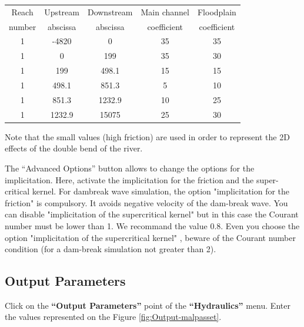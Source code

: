 \documentclass[a4paper,12pt]{article}
\begin{document}
\begin{table}[h]

\begin{center}

\begin{tabular}{|c|c|c|c|c|}


\hline 
Reach & Upstream & Downstream & Main channel & Floodplain \tabularnewline
number & abscissa & abscissa & coefficient & coefficient \tabularnewline
\hline 
\hline 
1 & -4820 & 0 & 35 & 35\tabularnewline
\hline 
1 & 0 & 199 & 35 & 30\tabularnewline
\hline 
1 & 199 & 498.1 & 15 & 15\tabularnewline
\hline 
1 & 498.1 & 851.3 & 5 & 10\tabularnewline
\hline 
1 & 851.3 & 1232.9 & 10 & 25\tabularnewline
\hline 
1 & 1232.9 & 15075 & 25 & 30\tabularnewline
\hline 

\end{tabular}

\end{center}

\end{table}

Note that the small values (high friction) are used in order to represent
the 2D effects of the double bend of the river.

\vspace{0.5cm}

The {}``Advanced Options'' button allows to change the options
for the implicitation. Here, activate the implicitation for the friction
and the super-critical kernel. For dambreak wave simulation, the option "implicitation for the friction" is compulsory. 
It avoids negative velocity of the dam-break wave. 
You can disable "implicitation of the supercritical kernel"  but in this case the Courant number must be lower than 1. We recommand the value 0.8. 
Even you choose the option "implicitation of the supercritical kernel" , beware of the Courant number condition (for a dam-break simulation not greater than 2).
\subsection{Output Parameters}

\hspace{0.5cm}Click on the \textbf{{}``Output Parameters''} point of the \textbf{{}``Hydraulics''}
menu. Enter the values represented on the Figure \ref{fig:Output-malpasset}.
\end{document}
